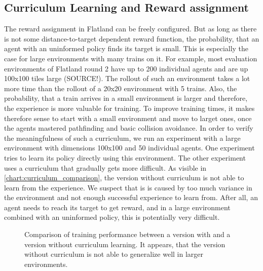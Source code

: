 \subsection*{Curriculum Learning and Reward assignment}\label{curriculum_learning}
The reward assignment in Flatland can be freely configured. But as long as there is not some distance-to-target dependent reward function, the probability, that an agent with an uninformed policy finds its target is small. This is especially the case for large environments with many trains on it. For example, most evaluation environments of Flatland round 2 have up to 200 individual agents and are up 100x100 tiles large (SOURCE!). The rollout of such an environment takes a lot more time than the rollout of a 20x20 environment with 5 trains. Also, the probability, that a train arrives in a small environment is larger and therefore, the experience is more valuable for training.
To improve training times, it makes therefore sense to start with a small environment and move to larget ones, once the agents mastered pathfinding and basic collision avoidance.
In order to verify the meaningfulness of such a curriculum, we run an experiment with a large environment with dimensions 100x100 and 50 individual agents. One experiment tries to learn its policy directly using this environment. The other experiment uses a curriculum that gradually gets more difficult.
As visible in \autoref{chart:curriculum_comparison}, the version without curriculum is not able to learn from the experience. We suspect that is is caused by too much variance in the environment and not enough successful experience to learn from. After all, an agent needs to reach its target to get reward, and in a large environment combined with an uninformed policy, this is potentially very difficult.
\begin{figure}[H]
	\begin{center}
		
	\end{center}
	\caption{Comparison of training performance between a version with and a version without curriculum learning. It appears, that the version without curriculum is not able to generalize well in larger environments.}
	\label{chart:curriculum_comparison}
\end{figure}
